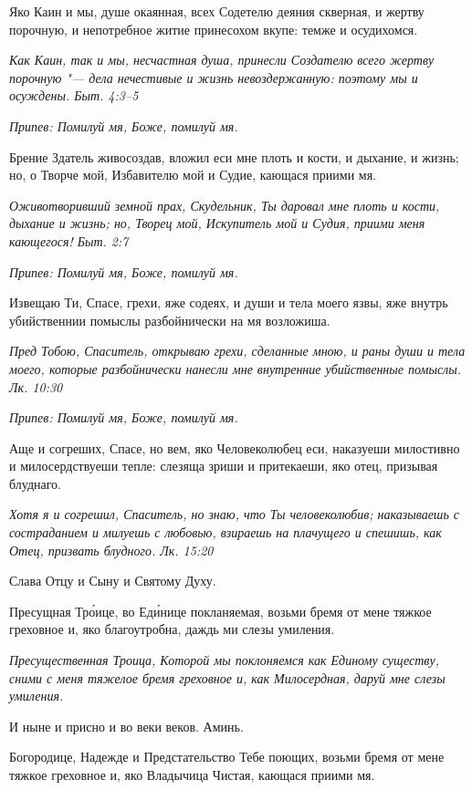 Яко Каин и мы, душе окаянная, всех Содетелю деяния скверная, и жертву порочную, и непотребное житие принесохом вкупе: темже и осудихомся.


\itshape Как Каин, так и мы, несчастная душа, принесли Создателю всего жертву порочную "--- дела нечестивые и жизнь невоздержанную: поэтому мы и осуждены. Быт. 4:3–5\normalfont{}


\itshape Припев:\normalfont{} Помилуй мя, Боже, помилуй мя.


Брение Здатель живосоздав, вложил еси мне плоть и кости, и дыхание, и жизнь; но, о Творче мой, Избавителю мой и Судие, кающася приими мя.


\itshape Оживотворивший земной прах, Скудельник, Ты даровал мне плоть и кости, дыхание и жизнь; но, Творец мой, Искупитель мой и Судия, приими меня кающегося! Быт. 2:7\normalfont{}


\itshape Припев:\normalfont{} Помилуй мя, Боже, помилуй мя.


Извещаю Ти, Спасе, грехи, яже содеях, и души и тела моего язвы, яже внутрь убийственнии помыслы разбойнически на мя возложиша.


\itshape Пред Тобою, Спаситель, открываю грехи, сделанные мною, и раны души и тела моего, которые разбойнически нанесли мне внутренние убийственные помыслы. Лк. 10:30\normalfont{}


\itshape Припев:\normalfont{} Помилуй мя, Боже, помилуй мя.


Аще и согреших, Спасе, но вем, яко Человеколюбец еси, наказуеши милостивно и милосердствуеши тепле: слезяща зриши и притекаеши, яко отец, призывая блуднаго.


\itshape Хотя я и согрешил, Спаситель, но знаю, что Ты человеколюбив; наказываешь с состраданием и милуешь с любовью, взираешь на плачущего и спешишь, как Отец, призвать блудного. Лк. 15:20\normalfont{}


Слава Отцу и Сыну и Святому Духу.


Пресущная Тро́ице, во Еди́нице покланяемая, возьми бремя от мене тяжкое греховное и, яко благоутробна, даждь ми слезы умиления.


\itshape Пресущественная Троица, Которой мы поклоняемся как Единому существу, сними с меня тяжелое бремя греховное и, как Милосердная, даруй мне слезы умиления.\normalfont{}


И ныне и присно и во веки веков. Аминь.


Богородице, Надежде и Предстательство Тебе поющих, возьми бремя от мене тяжкое греховное и, яко Владычица Чистая, кающася приими мя.


